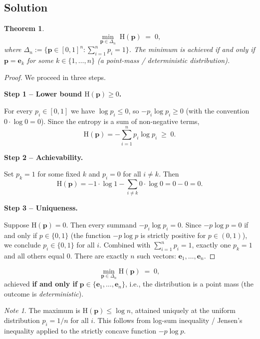 \documentclass[12pt,a4paper]{article}
\theoremstyle{plain}
\newtheorem{theorem}{Theorem}[section]
\theoremstyle{definition}
\theoremstyle{remark}
\newtheorem*{note}{Note}
\newcommand{\HH}{\mathrm{H}}
\begin{document}
\subsection*{Solution}

\begin{theorem}
  \[
    \min_{\mathbf{p}\in\Delta_n}\; \HH(\mathbf{p}) \;=\; 0,
  \]
  where $\Delta_n := \{\mathbf{p}\in[0,1]^n : \sum_{i=1}^n p_i = 1\}$.
  The minimum is achieved \emph{if and only if} $\mathbf{p} = \mathbf{e}_k$
  for some $k\in\{1,\dots,n\}$ (a point-mass / deterministic distribution).
\end{theorem}

\begin{proof}
We proceed in three steps.

\textbf{Step 1 – Lower bound $\HH(\mathbf{p})\ge 0$.}

For every $p_i \in [0,1]$ we have $\log p_i \le 0$, so
$-p_i\log p_i \ge 0$ (with the convention $0\cdot\log 0 = 0$).
Since the entropy is a sum of non-negative terms,
\[
  \HH(\mathbf{p}) = -\sum_{i=1}^n p_i\log p_i \;\ge\; 0.
\]

\textbf{Step 2 – Achievability.}

Set $p_k = 1$ for some fixed $k$ and $p_i = 0$ for all $i\neq k$.  Then
\[
  \HH(\mathbf{p}) = -1\cdot\log 1 - \sum_{i\neq k} 0\cdot\log 0 = 0 - 0 = 0.
\]

\textbf{Step 3 – Uniqueness.}

Suppose $\HH(\mathbf{p}) = 0$.  Then every summand $-p_i\log p_i = 0$.
Since $-p\log p = 0$ if and only if $p\in\{0,1\}$ (the function $-p\log p$ is
strictly positive for $p\in(0,1)$), we conclude $p_i\in\{0,1\}$ for all $i$.
Combined with $\sum_{i=1}^n p_i = 1$, exactly one $p_k = 1$ and all others
equal $0$.  There are exactly $n$ such vectors: $\mathbf{e}_1,\dots,\mathbf{e}_n$.
\end{proof}

\begin{resultbox}
\[
  \boxed{\min_{\mathbf{p}\in\Delta_n} \HH(\mathbf{p}) \;=\; 0,}
\]
achieved \textbf{if and only if} $\mathbf{p}\in\{\mathbf{e}_1,\dots,\mathbf{e}_n\}$,
i.e., the distribution is a point mass (the outcome is \emph{deterministic}).
\end{resultbox}

\begin{note}
The maximum is $\HH(\mathbf{p})\le \log n$, attained uniquely at the uniform
distribution $p_i = 1/n$ for all $i$.  This follows from log-sum inequality /
Jensen's inequality applied to the strictly concave function $-p\log p$.
\end{note}
\end{document}

